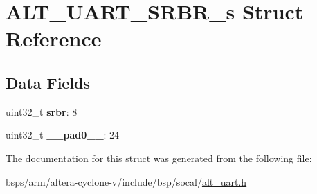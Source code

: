 \hypertarget{structALT__UART__SRBR__s}{}\section{A\+L\+T\+\_\+\+U\+A\+R\+T\+\_\+\+S\+R\+B\+R\+\_\+s Struct Reference}
\label{structALT__UART__SRBR__s}
\subsection*{Data Fields}
\begin{DoxyCompactItemize}
\item 
\mbox{\label{structALT__UART__SRBR__s_a54de746ccfbee4ba0a9b8d56a6ea9fd7}} 
uint32\+\_\+t {\bfseries srbr}\+: 8
\item 
\mbox{\label{structALT__UART__SRBR__s_ab949cca4eaf0de98633f9da8551ace6c}} 
uint32\+\_\+t {\bfseries \+\_\+\+\_\+pad0\+\_\+\+\_\+}\+: 24
\end{DoxyCompactItemize}


The documentation for this struct was generated from the following file\+:\begin{DoxyCompactItemize}
\item 
bsps/arm/altera-\/cyclone-\/v/include/bsp/socal/\mbox{\hyperlink{alt__uart_8h}{alt\+\_\+uart.\+h}}\end{DoxyCompactItemize}
